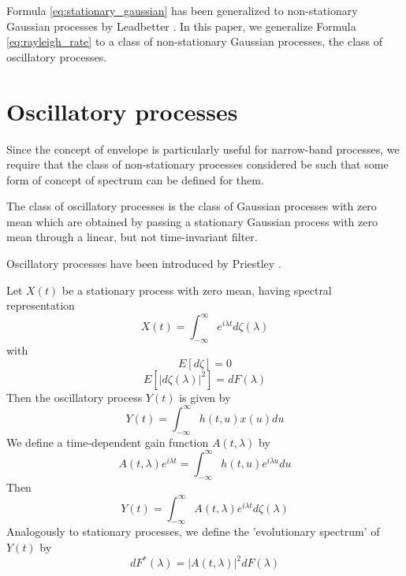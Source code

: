 \documentclass{article}
\begin{document}
Formula \ref{eq:stationary_gaussian} has been generalized to non-stationary
Gaussian processes by Leadbetter {\cite{leadbetter1966}}. In this paper, we
generalize Formula \ref{eq:rayleigh_rate} to a class of non-stationary
Gaussian processes, the class of oscillatory processes.

\section{Oscillatory processes}

Since the concept of envelope is particularly useful for narrow-band
processes, we require that the class of non-stationary processes considered be
such that some form of concept of spectrum can be defined for them.

The class of oscillatory processes is the class of Gaussian processes with
zero mean which are obtained by passing a stationary Gaussian process with
zero mean through a linear, but not time-invariant filter.

Oscillatory processes have been introduced by Priestley
{\cite{priestley1965}}.

Let $X (t)$ be a stationary process with zero mean, having spectral
representation
\begin{equation}
  \label{eq:spectral_representation} X (t) = \int_{- \infty}^{\infty} e^{i
  \lambda t} d \zeta (\lambda)
\end{equation}
with
\begin{equation}
  E [d \zeta] = 0
\end{equation}
\begin{equation}
  E [|d \zeta (\lambda) |^2] = dF (\lambda)
\end{equation}
Then the oscillatory process $Y (t)$ is given by
\begin{equation}
  \label{eq:oscillatory_process} Y (t) = \int_{- \infty}^{\infty} h (t, u) x
  (u) du
\end{equation}
We define a time-dependent gain function $A (t, \lambda)$ by
\begin{equation}
  \label{eq:gain_function} A (t, \lambda) e^{i \lambda t} = \int_{-
  \infty}^{\infty} h (t, u) e^{i \lambda u} du
\end{equation}
Then
\begin{equation}
  \label{eq:oscillatory_representation} Y (t) = \int_{- \infty}^{\infty} A (t,
  \lambda) e^{i \lambda t} d \zeta (\lambda)
\end{equation}
Analogously to stationary processes, we define the 'evolutionary spectrum' of
$Y (t)$ by
\begin{equation}
  \label{eq:evolutionary_spectrum} dF^{\ast} (\lambda) = |A (t, \lambda) |^2
  dF (\lambda)
\end{equation}
\end{document}
